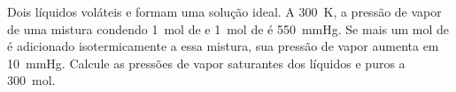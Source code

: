Dois líquidos voláteis  e  formam uma solução ideal.
A \SI{300}{\kelvin}, a pressão de vapor de uma mistura condendo \SI{1}{\mol} de  e \SI{1}{\mol} de  é \SI{550}{mmHg}.
Se mais um \si{mol} de  é adicionado isotermicamente a essa mistura, sua pressão de vapor aumenta em \SI{10}{mmHg}.
Calcule as pressões de vapor saturantes dos líquidos   e  puros a \SI{300}{mol}.
